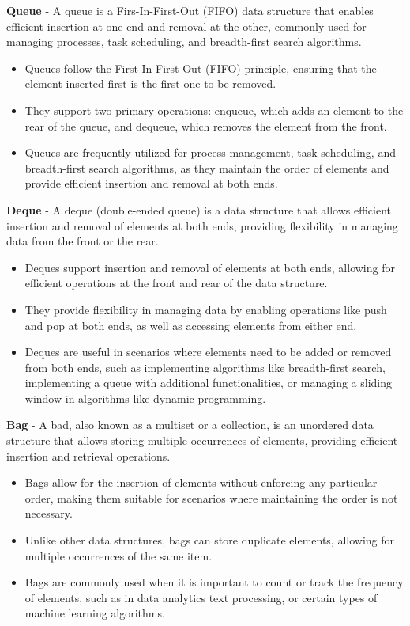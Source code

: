 \begin{solution}
    \textbf{Queue} - A queue is a Firs-In-First-Out (FIFO) data structure that enables efficient insertion at one end and removal at the other, commonly used for managing
    processes, task scheduling, and breadth-first search algorithms.
    \begin{itemize}
        \item Queues follow the First-In-First-Out (FIFO) principle, ensuring that the element inserted first is the first one to be removed.
        \item They support two primary operations: enqueue, which adds an element to the rear of the queue, and dequeue, which removes the element from the front.
        \item Queues are frequently utilized for process management, task scheduling, and breadth-first search algorithms, as they maintain the order of elements and provide efficient
        insertion and removal at both ends.
    \end{itemize}

    \textbf{Deque} - A deque (double-ended queue) is a data structure that allows efficient insertion and removal of elements at both ends, providing flexibility in managing
    data from the front or the rear.
    \begin{itemize}
        \item Deques support insertion and removal of elements at both ends, allowing for efficient operations at the front and rear of the data structure.
        \item They provide flexibility in managing data by enabling operations like push and pop at both ends, as well as accessing elements from either end.
        \item Deques are useful in scenarios where elements need to be added or removed from both ends, such as implementing algorithms like breadth-first search, implementing a queue
        with additional functionalities, or managing a sliding window in algorithms like dynamic programming.
    \end{itemize}

    \textbf{Bag} - A bad, also known as a multiset or a collection, is an unordered data structure that allows storing multiple occurrences of elements, providing efficient
    insertion and retrieval operations.
    \begin{itemize}
        \item Bags allow for the insertion of elements without enforcing any particular order, making them suitable for scenarios where maintaining the order is not necessary.
        \item Unlike other data structures, bags can store duplicate elements, allowing for multiple occurrences of the same item.
        \item Bags are commonly used when it is important to count or track the frequency of elements, such as in data analytics text processing, or certain types of machine learning
        algorithms.
    \end{itemize}


\end{solution}
